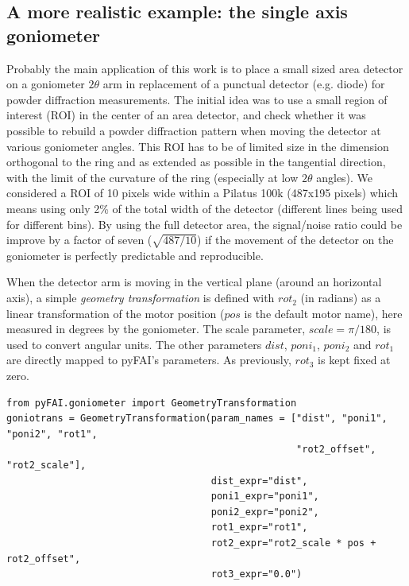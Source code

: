 \documentclass[preprint]{iucr}              %
\begin{document}
\subsection{A more realistic example: the single axis goniometer}

Probably the main application of this work is to place a small sized area detector
on a goniometer $2\theta$ arm in replacement of a punctual detector (e.g. diode) for 
powder diffraction measurements. 
The initial idea was to use a small region of interest (ROI) in the center of
an area detector, and check whether it was possible to rebuild a powder diffraction pattern
when moving the detector at various goniometer angles.
This ROI has to be of limited size in the dimension orthogonal to the ring and as extended
as possible in the tangential direction, with the limit of the curvature of the ring 
(especially at low $2\theta$ angles).
We considered a ROI of 10 pixels wide within a Pilatus 100k (487x195 pixels)
which means using only 2\% of the total width of the detector (different lines being used for different bins). 
By using the full detector area, the signal/noise ratio could be improve by a factor of seven 
($\sqrt{487/10}$) if the movement of the detector on the goniometer is perfectly predictable and reproducible.

When the detector arm is moving in the vertical plane (around an horizontal axis), 
a simple \textit{geometry transformation} is defined with $rot_2$ (in radians) as a
linear transformation of the motor position ($pos$ is the default motor name), here measured 
in degrees by the goniometer.
The scale parameter, $scale = \pi / 180$, is used to convert angular units.
The other parameters $dist$, $poni_1$, $poni_2$ and $rot_1$ are directly mapped
to pyFAI's parameters.
As previously, $rot_3$ is kept fixed at zero.

\begin{verbatim}
from pyFAI.goniometer import GeometryTransformation
goniotrans = GeometryTransformation(param_names = ["dist", "poni1", "poni2", "rot1",
                                                   "rot2_offset", "rot2_scale"],
                                    dist_expr="dist", 
                                    poni1_expr="poni1",
                                    poni2_expr="poni2", 
                                    rot1_expr="rot1", 
                                    rot2_expr="rot2_scale * pos + rot2_offset", 
                                    rot3_expr="0.0")
\end{verbatim}
\end{document}
